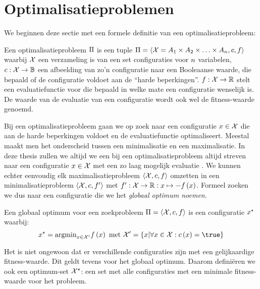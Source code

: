 \section{Optimalisatieproblemen}

We beginnen deze sectie met een formele definitie van een optimalisatieprobleem:

\begin{definition}[Optimalisatieprobleem]%
Een optimalisatieprobleem $\Pi$ is een tuple $\Pi=\left\langle \mathcal{X}=A_1\times A_2\times\ldots\times A_{n},c,f\right\rangle$ waarbij $\mathcal{X}$ een verzameling is van een set configuraties voor $n$ variabelen, $c:\mathcal{X}\rightarrow \mathbb{B}$ een afbeelding van zo'n configuratie naar een Booleaanse waarde, die bepaald of de configuratie voldoet aan de ``harde beperkingen''. $f:\mathcal{X}\rightarrow \mathbb{R}$ stelt een evaluatiefunctie voor die bepaald in welke mate een configuratie wenselijk is. De waarde van de evaluatie van een configuratie  wordt ook wel de fitness-waarde genoemd.
\end{definition}
Bij een optimalisatieprobleem gaan we op zoek naar een configuratie $x\in\mathcal{X}$ die aan de harde beperkingen voldoet en de evaluatiefunctie optimaliseert. Meestal maakt men het onderscheid tussen een minimalisatie en een maximalisatie. In deze thesis zullen we altijd we een bij een optimalisatieprobleem altijd streven naar een configuratie $x\in\mathcal{X}$ met een zo laag mogelijk evaluatie . We kunnen echter eenvoudig elk maximalisatieprobleem $\left\langle \mathcal{X},c,f\right\rangle$ omzetten in een minimalisatieprobleem $\left\langle \mathcal{X},c,f'\right\rangle$ met $f':\mathcal{X}\rightarrow \mathbb{R}:x\mapsto -f\left(x\right)$. Formeel zoeken we dus naar een configuratie \xstar{} die we het \emph{globaal optimum noemen}.

\begin{definition}
Een globaal optimum voor een zoekprobleem $\Pi=\left\langle \mathcal{X},c,f\right\rangle$ is een configuratie $x^{\star}$ waarbij:
\begin{equation}
\bestSol=\displaystyle\argmin_{\sol\in\ConfigValSet}\fun{\evalfun}{\sol}\mbox{ met }\ConfigValSet=\accl{\sol|\forall\sol\in\ConfigSet:\fun{\hcfun}{\sol}=\true}
\end{equation}
\end{definition}

Het is niet ongewoon dat er verschillende configuraties zijn met een gelijkaardige fitness-waarde. Dit geldt tevens voor het globaal optimum. Daarom defini\"eren we ook een optimum-set $\mathcal{X}^{\star}$: een set met alle configuraties met een minimale fitness-waarde voor het probleem.


